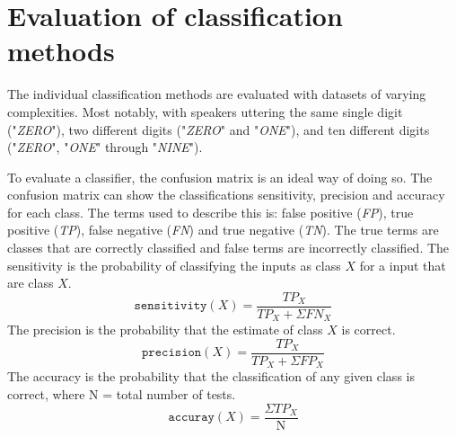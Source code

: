 \chapter{Evaluation of classification methods}
The individual classification methods are evaluated with datasets of varying complexities.
Most notably, with speakers uttering the same single digit ("\textit{ZERO}"), two different digits ("\textit{ZERO}" and "\textit{ONE}"), and ten different digits ("\textit{ZERO}", "\textit{ONE}" through "\textit{NINE}").


To evaluate a classifier, the confusion matrix is an ideal way of doing so.
The confusion matrix can show the classifications sensitivity, precision and accuracy for each class. 
The terms used to describe this is: false positive (\textit{FP}), true positive (\textit{TP}), false negative (\textit{FN}) and true negative (\textit{TN}).
The true terms are classes that are correctly classified and false terms are incorrectly classified.
The sensitivity is the probability of classifying the inputs as class $X$ for a input that are class $X$.
\begin{equation}
\mathtt{sensitivity}(X) = \dfrac{TP_X}{TP_X+\Sigma FN_X}
\label{eq:sensitivity}
\end{equation}
The precision is the probability that the estimate of class $X$ is correct.
\begin{equation}
\mathtt{precision}(X) = \dfrac{TP_X}{TP_X+\Sigma FP_X}
\label{eq:precision}
\end{equation}
The accuracy is the probability that the classification of any given class is correct, where N = total number of tests.
\begin{equation}
\mathtt{accuray}(X) = \dfrac{\Sigma TP_X}{\mathrm{N}}
\label{eq:accuracy}
\end{equation}

